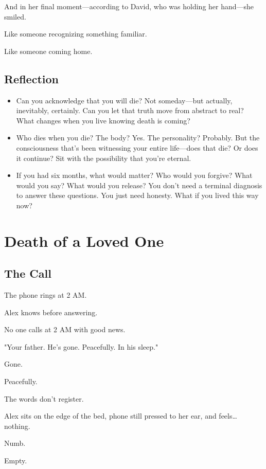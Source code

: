 \documentclass[11pt,twoside]{book}
\begin{document}
And in her final moment—according to David, who was holding her hand—she smiled.

Like someone recognizing something familiar.

Like someone coming home.

\section*{Reflection}

\begin{itemize}
\item Can you acknowledge that you will die? Not someday—but actually, inevitably, certainly. Can you let that truth move from abstract to real? What changes when you live knowing death is coming?
\item Who dies when you die? The body? Yes. The personality? Probably. But the consciousness that's been witnessing your entire life—does that die? Or does it continue? Sit with the possibility that you're eternal.
\item If you had six months, what would matter? Who would you forgive? What would you say? What would you release? You don't need a terminal diagnosis to answer these questions. You just need honesty. What if you lived this way now?
\end{itemize}

\chapter{Death of a Loved One}

\section*{The Call}

The phone rings at 2 AM.

Alex knows before answering.

No one calls at 2 AM with good news.

"Your father. He's gone. Peacefully. In his sleep."

Gone.

Peacefully.

The words don't register.

Alex sits on the edge of the bed, phone still pressed to her ear, and feels\ldots{} nothing.

Numb.

Empty.
\end{document}
